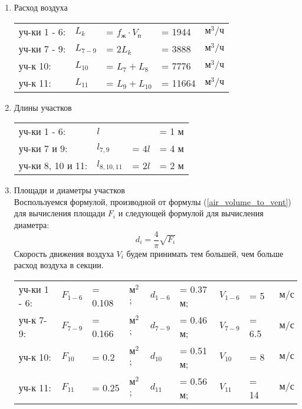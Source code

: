 \begin{enumerate}
    \item   Расход воздуха \\
            \begin{tabular}{lllll}
                уч-ки 1 - 6:    & $L_k $    & = $f_\text{ж} \cdot V_\text{п}$   & = 1944    & $\text{м}^3 / \text{ч}$ \\
                уч-ки 7 - 9:    & $L_{7-9}$ & = $2 L_k$                         & = 3888    & $\text{м}^3 / \text{ч}$ \\
                уч-к 10:        & $L_{10}$  & = $L_{7} + L_{8}$                 & = 7776    & $\text{м}^3 / \text{ч}$ \\
                уч-к 11:        & $L_{11}$  & = $L_{9} + L_{10}$                & = 11664   & $\text{м}^3 / \text{ч}$ \\
            \end{tabular}

    \item   Длины участков \\
            \begin{tabular}{llll}
                уч-ки 1 - 6:        & $l$           &           & = 1 м \\
                уч-ки 7 и 9:        & $l_{7,9}$     & = $4 l$   & = 4 м \\
                уч-ки 8, 10 и 11:   & $l_{8,10,11}$ & = $2 l$   & = 2 м \\
            \end{tabular}

    \item   Площади и диаметры участков \\
            Воспользуемся формулой, производной от формулы (\ref{air_volume_to_vent})
            для вычисления площади $F_i$ и следующей формулой для вычисления диаметра:
            \begin{equation}
            \label{vent_section_d}
                d_i = \frac{4}{\pi} \sqrt{F_i}
            \end{equation}
            Скорость движения воздуха $V_i$ будем принимать тем большей, чем больше
            расход воздуха в секции. \\
            \begin{tabular}{lllllllll}
                уч-ки 1 - 6:    & $F_{1-6}$ & = 0.108   & $\text{м}^2$; & $d_{1-6}$ & = 0.37 м; & $V_{1-6}$ & = 5   & $~\text{м/с}$     \\
                уч-к 7-9:       & $F_{7-9}$ & = 0.166   & $\text{м}^2$; & $d_{7-9}$ & = 0.46 м; & $V_{7-9}$ & = 6.5 & $~\text{м/с}$     \\
                уч-к 10:        & $F_{10}$  & = 0.2     & $\text{м}^2$; & $d_{10}$  & = 0.51 м; & $V_{10}$  & = 8   & $~\text{м/с}$     \\
                уч-к 11:        & $F_{11}$  & = 0.25    & $\text{м}^2$; & $d_{11}$  & = 0.56 м; & $V_{11}$  & = 14  & $~\text{м/с}$     \\
            \end{tabular}


\end{enumerate}
